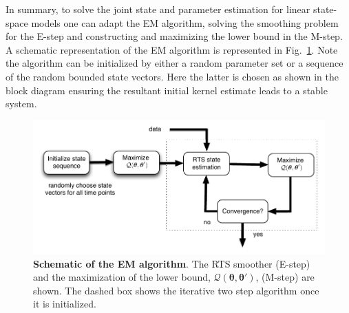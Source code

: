 \documentclass[review,authoryear,3p]{elsarticle}
\begin{document}
In summary, to solve the joint state and parameter estimation for linear state-space models one can adapt the EM algorithm, solving the smoothing problem for the E-step and constructing and maximizing the lower bound in the M-step. A schematic representation of the EM algorithm is represented in Fig.~\ref{fig:EMBlockDiagram}. Note the algorithm can be initialized by either a random parameter set or a sequence of the random bounded state vectors. Here the latter is chosen as shown in the block diagram ensuring the resultant initial kernel estimate leads to a stable system.  
\begin{figure}[!t]
\centering
\includegraphics[scale=1]{./Graph/fig6.pdf}
\caption{{\bf Schematic of the EM algorithm}. The RTS smoother (E-step) and the maximization of the lower bound, $\mathcal Q(\boldsymbol \theta,\boldsymbol\theta')$, (M-step) are shown. The dashed box shows the iterative two step algorithm once it is initialized.}
\label{fig:EMBlockDiagram}
\end{figure}
\end{document}
